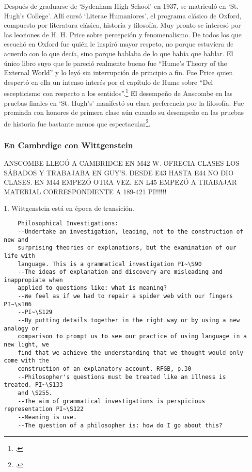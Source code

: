     Después de graduarse de `Sydenham High School' en 1937, se matriculó en `St.
    Hugh's College'. Allí cursó `Literae Humaniores', el programa clásico de Oxford,
    compuesto por literatura clásica, historia y filosofía. Muy pronto se interesó
    por las lecciones de H. H. Price sobre percepción y fenomenalismo. De todos los
    que escuchó en Oxford fue quién le inspiró mayor respeto, no porque estuviera de
    acuerdo con lo que decía, sino porque hablaba de lo que había que hablar. El
    único libro suyo que le pareció realmente bueno fue ``Hume's Theory of the
    External World'' y lo leyó sin interrupción de principio a
    fin. Fue Price quien despertó en ella un intenso interés por el capítulo de Hume
    sobre ``Del escepticismo con respecto a los sentidos''.\footcite[cf.~][p.~viii
    \S1]{M&PotM} El desempeño de Anscombe en las pruebas finales en `St. Hugh's'
    manifestó su clara preferencia por la filosofía. Fue premiada con honores de
    primera clase aún cuando su desempeño en las pruebas de historia fue bastante
    menos que espectacular\footcite[p.~3~\S1]{teichmann}.

    \subsubsection{En Cambrdige con Wittgenstein}
    ANSCOMBE LLEGÓ A CAMBRIDGE EN M42 W. OFRECIA CLASES LOS SÁBADOS Y TRABAJABA EN
    GUY'S. DESDE E43 HASTA E44 NO DIO CLASES. EN M44 EMPEZÓ OTRA VEZ. EN L45 EMPEZÓ
    A TRABAJAR MATERIAL CORRESPONDIENTE A 189-421 PI!!!!!!

    1. Wittgenstein está en época de transición.
    \begin{verbatim}
    Philosophical Investigations:
    --Undertake an investigation, leading, not to the construction of new and
    surprising theories or explanations, but the examination of our life with
    language. This is a grammatical investigation PI~\S90 
    --The ideas of explanation and discovery are misleading and inappropiate when
    applied to questions like: what is meaning?
    --We feel as if we had to repair a spider web with our fingers PI~\s106
    --PI~\S129
    --By putting details together in the right way or by using a new analogy or
    comparison to prompt us to see our practice of using language in a new light, we
    find that we achieve the understanding that we thought would only come with the
    construction of an explanatory account. RFGB, p.30
    --Philosopher's questions must be treated like an illness is treated. PI~\S133
    and \S255.
    --The aim of grammatical investigations is perspicious representation PI~\S122
    --Meaning is use.
    --The question of a philosopher is: how do I go about this?
    \end{verbatim}


